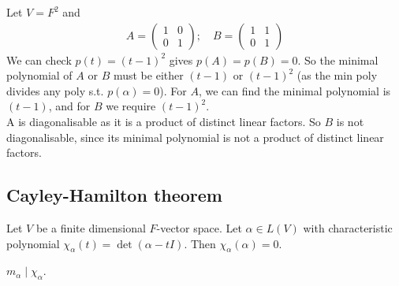 \begin{example}
	Let $V = F^2$ and
	\begin{align*}
		A= \begin{pmatrix}
			1 & 0 \\
			0 & 1
		\end{pmatrix};\quad B = \begin{pmatrix}
			1 & 1 \\
			0 & 1
		\end{pmatrix}
	\end{align*}
	We can check $p(t) = (t-1)^2$ gives $p(A) = p(B) = 0$.
	So the minimal polynomial of $A$ or $B$ must be either $(t-1)$ or $(t-1)^2$ (as the min poly divides any poly s.t. $p(\alpha) = 0$).
	For $A$, we can find the minimal polynomial is $(t-1)$, and for $B$ we require $(t-1)^2$. \\
	A is diagonalisable as it is a product of distinct linear factors.
	So $B$ is not diagonalisable, since its minimal polynomial is not a product of distinct linear factors.
\end{example}

\subsection{Cayley-Hamilton theorem}
\begin{theorem}
	Let $V$ be a finite dimensional $F$-vector space.
	Let $\alpha \in L(V)$ with characteristic polynomial $\chi_\alpha(t) = \det(\alpha - t I)$.
	Then $\chi_\alpha(\alpha) = 0$.
\end{theorem}

\begin{corollary}
	$m_\alpha \mid \chi_\alpha$.
\end{corollary} 

